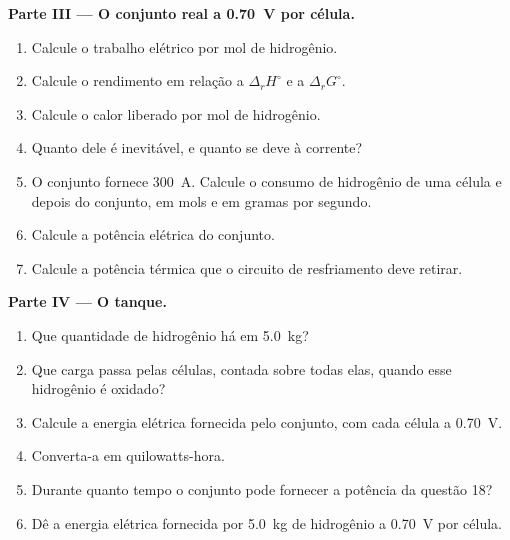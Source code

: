 \begin{problem}
\medskip
\noindent\textbf{Parte III --- O conjunto real a \qty{0.70}{V} por célula.}
\begin{enumerate}[resume]
  \item Calcule o trabalho elétrico por mol de hidrogênio.
  \item Calcule o rendimento em relação a $\Delta_r H^\circ$ e a $\Delta_r G^\circ$.
  \item Calcule o calor liberado por mol de hidrogênio.
  \item Quanto dele é inevitável, e quanto se deve à corrente?
  \item O conjunto fornece \qty{300}{A}. Calcule o consumo de hidrogênio de uma
        célula e depois do conjunto, em mols e em gramas por segundo.
  \item Calcule a potência elétrica do conjunto.
  \item Calcule a potência térmica que o circuito de resfriamento deve retirar.
\end{enumerate}

\medskip
\noindent\textbf{Parte IV --- O tanque.}
\begin{enumerate}[resume]
  \item Que quantidade de hidrogênio há em \qty{5.0}{kg}?
  \item Que carga passa pelas células, contada sobre todas elas, quando esse
        hidrogênio é oxidado?
  \item Calcule a energia elétrica fornecida pelo conjunto, com cada célula a
        \qty{0.70}{V}.
  \item Converta-a em quilowatts-hora.
  \item Durante quanto tempo o conjunto pode fornecer a potência da questão 18?
  \item Dê a energia elétrica fornecida por \qty{5.0}{kg} de hidrogênio a
        \qty{0.70}{V} por célula.
\end{enumerate}
\end{problem}
